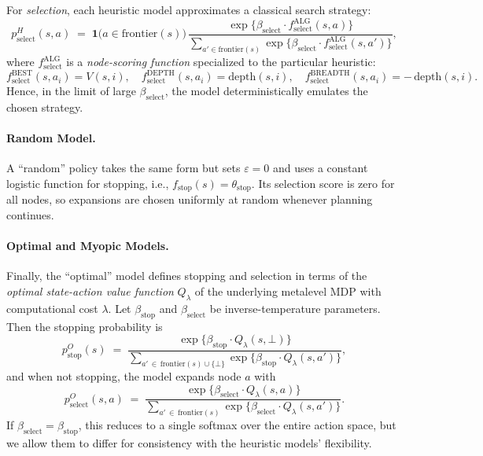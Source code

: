 \documentclass[a4paper,12pt,oneside,article]{memoir}
\begin{document}
For \emph{selection}, each heuristic model approximates a
classical search strategy:
\begin{equation}
p_{\mathrm{select}}^{H}(s,a)
\;=\;
\mathbf{1}\bigl(a \in \mathrm{frontier}(s)\bigr)\,\frac{\exp\bigl\{\beta_{\mathrm{select}}
    \cdot f_{\mathrm{select}}^{\mathrm{ALG}}(s,a)\bigr\}}
    {\sum_{a'\in \mathrm{frontier}(s)}
       \exp\{\beta_{\mathrm{select}}\cdot f_{\mathrm{select}}^{\mathrm{ALG}}(s,a')\}},
\label{eq:pSelectH}
\end{equation}
where \(f_{\mathrm{select}}^{\mathrm{ALG}}\) is a
\emph{node-scoring function} specialized to the particular
heuristic: 
\[
f_{\mathrm{select}}^{\text{BEST}}(s,a_i) = V(s,i),
\quad
f_{\mathrm{select}}^{\text{DEPTH}}(s,a_i) = \mathrm{depth}(s,i),
\quad
f_{\mathrm{select}}^{\text{BREADTH}}(s,a_i) = -\,\mathrm{depth}(s,i).
\]
Hence, in the limit of large \(\beta_{\mathrm{select}}\),
the model deterministically emulates the chosen strategy.

\paragraph{Random Model.}
A “random” policy takes the same form but sets \(\varepsilon=0\)
and uses a constant logistic function for stopping, i.e.,
\(f_{\mathrm{stop}}(s)=\theta_{\mathrm{stop}}\). Its selection
score is zero for all nodes, so expansions are chosen uniformly
at random whenever planning continues.

\paragraph{Optimal and Myopic Models.}
Finally, the “optimal” model defines stopping and selection in
terms of the \emph{optimal state-action value function}
\(Q_\lambda\) of the underlying metalevel MDP with
computational cost \(\lambda\). Let \(\beta_{\mathrm{stop}}\)
and \(\beta_{\mathrm{select}}\) be inverse-temperature
parameters. Then the stopping probability is
\begin{equation}
p_{\mathrm{stop}}^{O}(s)
\;=\;
  \frac{\exp\bigl\{\beta_{\mathrm{stop}}\cdot Q_\lambda(s,\bot)\bigr\}}
       {\sum\limits_{a'\,\in\,\mathrm{frontier}(s)\cup\{\bot\}}
        \exp\bigl\{\beta_{\mathrm{stop}}\cdot Q_\lambda(s,a')\bigr\}},
\label{eq:pStopO}
\end{equation}
and when not stopping, the model expands node \(a\) with
\begin{equation}
p_{\mathrm{select}}^{O}(s,a)
\;=\;
  \frac{\exp\bigl\{\beta_{\mathrm{select}}\cdot Q_\lambda(s,a)\bigr\}}
       {\sum\limits_{a'\,\in\,\mathrm{frontier}(s)}
        \exp\bigl\{\beta_{\mathrm{select}}\cdot Q_\lambda(s,a')\bigr\}}.
\label{eq:pSelectO}
\end{equation}
If \(\beta_{\mathrm{select}}=\beta_{\mathrm{stop}}\), this
reduces to a single softmax over the entire action space, but
we allow them to differ for consistency with the heuristic
models’ flexibility.
\end{document}
